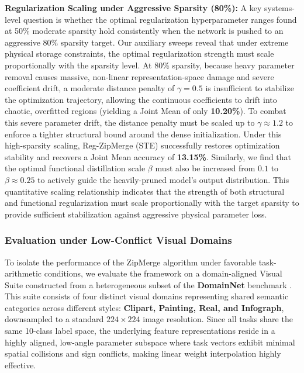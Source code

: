 \textbf{Regularization Scaling under Aggressive Sparsity (80\%):} A key systems-level question is whether the optimal regularization hyperparameter ranges found at 50\% moderate sparsity hold consistently when the network is pushed to an aggressive 80\% sparsity target. Our auxiliary sweeps reveal that under extreme physical storage constraints, the optimal regularization strength must scale proportionally with the sparsity level. At 80\% sparsity, because heavy parameter removal causes massive, non-linear representation-space damage and severe coefficient drift, a moderate distance penalty of $\gamma = 0.5$ is insufficient to stabilize the optimization trajectory, allowing the continuous coefficients to drift into chaotic, overfitted regions (yielding a Joint Mean of only \textbf{10.20\%}). To combat this severe parameter drift, the distance penalty must be scaled up to $\gamma \approx 1.2$ to enforce a tighter structural bound around the dense initialization. Under this high-sparsity scaling, Reg-ZipMerge (STE) successfully restores optimization stability and recovers a Joint Mean accuracy of \textbf{13.15\%}. Similarly, we find that the optimal functional distillation scale $\beta$ must also be increased from $0.1$ to $\beta \approx 0.25$ to actively guide the heavily-pruned model's output distribution. This quantitative scaling relationship indicates that the strength of both structural and functional regularization must scale proportionally with the target sparsity to provide sufficient stabilization against aggressive physical parameter loss.

\subsubsection{Evaluation under Low-Conflict Visual Domains}
To isolate the performance of the ZipMerge algorithm under favorable task-arithmetic conditions, we evaluate the framework on a domain-aligned Visual Suite constructed from a heterogeneous subset of the \textbf{DomainNet} benchmark \cite{peng2019moment}. This suite consists of four distinct visual domains representing shared semantic categories across different styles: \textbf{Clipart, Painting, Real, and Infograph}, downsampled to a standard $224 \times 224$ image resolution. Since all tasks share the same 10-class label space, the underlying feature representations reside in a highly aligned, low-angle parameter subspace where task vectors exhibit minimal spatial collisions and sign conflicts, making linear weight interpolation highly effective.

